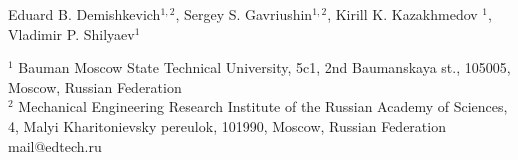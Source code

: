 \thispagestyle{empty}
{}

\vspace{5mm}

\begin{center} Eduard B. Demishkevich$^{1,2}$, Sergey S. Gavriushin$^{1,2}$, Kirill K. Kazakhmedov $^{1}$, Vladimir P. Shilyaev$^{1}$  \\

\vspace{5mm}

{\small $^{1}$ Bauman Moscow State Technical University, 5c1, 2nd Baumanskaya st., 105005, Moscow, Russian Federation \\
$^{2}$ Mechanical Engineering Research Institute of the Russian Academy of Sciences, 4, Malyi Kharitonievsky pereulok, 101990, Moscow, Russian Federation \\
mail@edtech.ru }
\end{center}
